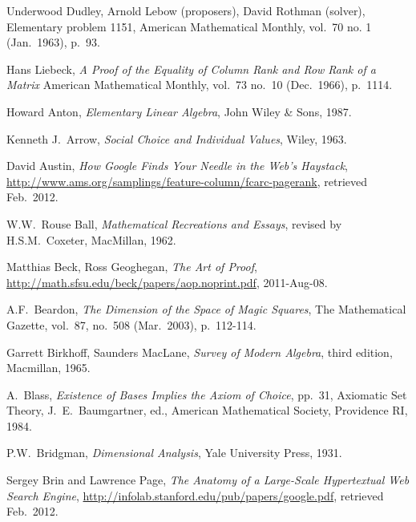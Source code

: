 \begin{thebibliography}{\makebox[2em][c]{{}\hfil{}}}
  Underwood Dudley, Arnold Lebow (proposers), David Rothman (solver),
  Elementary problem 1151,
  American Mathematical Monthly,
  vol.\ 70 no. 1 (Jan.\ 1963),
  p.~93.

  Hans Liebeck,
  \emph{A Proof of the Equality of Column Rank and Row Rank of a Matrix}
  American Mathematical Monthly,
  vol.\ 73 no.\ 10 (Dec.\ 1966),
  p.~1114.

  Howard Anton,
  \emph{Elementary Linear Algebra},
  John Wiley \& Sons,
  1987.

  Kenneth J.~Arrow,
  \emph{Social Choice and Individual Values},
  Wiley,
  1963.

  David Austin,
  \emph{How Google Finds Your Needle in the Web's Haystack},
  \url{http://www.ams.org/samplings/feature-column/fcarc-pagerank},
  retrieved Feb.~2012.

 W.W.~Rouse Ball,
 \emph{Mathematical Recreations and Essays},
 revised by H.S.M.~Coxeter,
 MacMillan,
 1962.


  Matthias Beck, Ross Geoghegan,
  \emph{The Art of Proof},
  \url{http://math.sfsu.edu/beck/papers/aop.noprint.pdf},
  2011-Aug-08.

  A.F.\ Beardon,
  \emph{The Dimension of the Space of Magic Squares},
  The Mathematical Gazette,
  vol.\ 87, no.\ 508 (Mar.\ 2003), p.~112-114.

  Garrett Birkhoff, Saunders MacLane,
  \emph{Survey of Modern Algebra},
  third edition,
  Macmillan, 
  1965.

  A.~Blass,
  \emph{Existence of Bases Implies the Axiom of Choice},
  pp.\ 31,
  Axiomatic Set Theory, J.\ E.\ Baumgartner, ed.,
  American Mathematical Society,
  Providence RI, 1984.

  P.W.~Bridgman,
  \emph{Dimensional Analysis},
  Yale University Press,
  1931.

  Sergey Brin and Lawrence Page,
  \emph{The Anatomy of a Large-Scale Hypertextual
        Web Search Engine},
  \url{http://infolab.stanford.edu/pub/papers/google.pdf},
  retrieved Feb.~2012.


\end{thebibliography}
